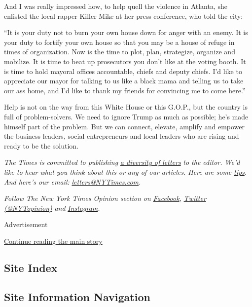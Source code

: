 And I was really impressed how, to help quell the violence in Atlanta,
she enlisted the local rapper Killer Mike at her press conference, who
told the city:

``It is your duty not to burn your own house down for anger with an
enemy. It is your duty to fortify your own house so that you may be a
house of refuge in times of organization. Now is the time to plot, plan,
strategize, organize and mobilize. It is time to beat up prosecutors you
don't like at the voting booth. It is time to hold mayoral offices
accountable, chiefs and deputy chiefs. I'd like to appreciate our mayor
for talking to us like a black mama and telling us to take our ass home,
and I'd like to thank my friends for convincing me to come here.''

Help is not on the way from this White House or this G.O.P., but the
country is full of problem-solvers. We need to ignore Trump as much as
possible; he's made himself part of the problem. But we can connect,
elevate, amplify and empower the business leaders, social entrepreneurs
and local leaders who are rising and ready to be the solution.

\emph{The Times is committed to publishing}
\href{https://www.nytimes3xbfgragh.onion/2019/01/31/opinion/letters/letters-to-editor-new-york-times-women.html}{\emph{a
diversity of letters}} \emph{to the editor. We'd like to hear what you
think about this or any of our articles. Here are some}
\href{https://help.nytimes3xbfgragh.onion/hc/en-us/articles/115014925288-How-to-submit-a-letter-to-the-editor}{\emph{tips}}\emph{.
And here's our email:}
\href{mailto:letters@NYTimes.com}{\emph{letters@NYTimes.com}}\emph{.}

\emph{Follow The New York Times Opinion section on}
\href{https://www.facebookcorewwwi.onion/nytopinion}{\emph{Facebook}}\emph{,}
\href{http://twitter.com/NYTOpinion}{\emph{Twitter (@NYTopinion)}}
\emph{and}
\href{https://www.instagram.com/nytopinion/}{\emph{Instagram}}\emph{.}

Advertisement

\protect\hyperlink{after-bottom}{Continue reading the main story}

\hypertarget{site-index}{%
\subsection{Site Index}\label{site-index}}

\hypertarget{site-information-navigation}{%
\subsection{Site Information
Navigation}\label{site-information-navigation}}

